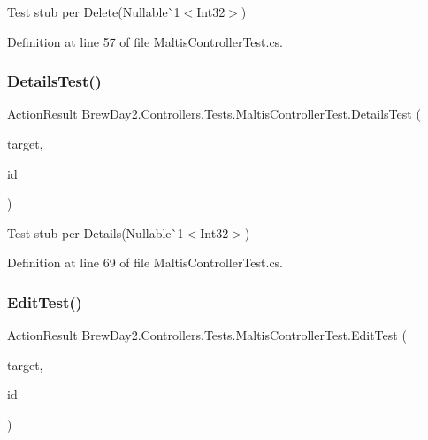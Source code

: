 Test stub per Delete(Nullable\`{}1$<$Int32$>$)



Definition at line 57 of file Maltis\+Controller\+Test.\+cs.

\mbox{\label{class_brew_day2_1_1_controllers_1_1_tests_1_1_maltis_controller_test_ac97cdcc1ec15f313b4741db9bed61b91}} 
\subsubsection{\texorpdfstring{Details\+Test()}{DetailsTest()}}
{\footnotesize\ttfamily Action\+Result Brew\+Day2.\+Controllers.\+Tests.\+Maltis\+Controller\+Test.\+Details\+Test (\begin{DoxyParamCaption}\item[{\mbox{[}\+Pex\+Assume\+Under\+Test\mbox{]} \mbox{\hyperlink{class_brew_day2_1_1_controllers_1_1_maltis_controller}{Maltis\+Controller}}}]{target,  }\item[{int?}]{id }\end{DoxyParamCaption})}



Test stub per Details(Nullable\`{}1$<$Int32$>$)



Definition at line 69 of file Maltis\+Controller\+Test.\+cs.

\mbox{\label{class_brew_day2_1_1_controllers_1_1_tests_1_1_maltis_controller_test_af474a0fe9e14ab702b71dfe31b3861ac}} 
\subsubsection{\texorpdfstring{Edit\+Test()}{EditTest()}}
{\footnotesize\ttfamily Action\+Result Brew\+Day2.\+Controllers.\+Tests.\+Maltis\+Controller\+Test.\+Edit\+Test (\begin{DoxyParamCaption}\item[{\mbox{[}\+Pex\+Assume\+Under\+Test\mbox{]} \mbox{\hyperlink{class_brew_day2_1_1_controllers_1_1_maltis_controller}{Maltis\+Controller}}}]{target,  }\item[{int?}]{id }\end{DoxyParamCaption})}



